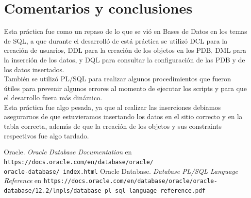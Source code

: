 \documentclass{article}
\begin{document}
\section*{Comentarios y conclusiones}

Esta práctica fue como un repaso de lo que se vió en Bases de Datos
en los temas de SQL, a que durante el desarrolló de está práctica se 
utilizó DCL para la creación de usuarios, DDL para la creación de los 
objetos en los PDB, DML para la inserción de los datos, y DQL para 
consultar la configuración de las PDB y de los datos insertados. \\

También se utilizó PL/SQL para realizar algunos procedimientos que fueron 
útiles para prevenir algunos errores al momento de ejecutar los scripts y 
para que el desarrollo fuera más dinámico.\\

Esta práctica fue algo pesada, ya que al realizar las inserciones debiamos 
asegurarnos de que estuvieramos insertando los datos en el sitio correcto 
y en la tabla correcta, además de que la creación de los objetos y sus 
constraints respectivos fue algo tardado. \\

\renewcommand\refname{Bibliografía}
\begin{thebibliography}{99}
     Oracle. \textit{Oracle Database Documentation} en 
        \texttt{https://docs.oracle.com/en/database/oracle/\\oracle-database/%
        index.html}
     Oracle Database. \textit{Database PL/SQL Language Reference} en 
        \texttt{https://docs.oracle.com/en/database/oracle/oracle-database/12.2/lnpls/database-pl-sql-language-reference.pdf}
\end{thebibliography}
\end{document}
